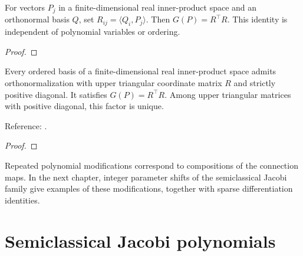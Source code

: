 \begin{supporting}
\begin{theorem}
\label{thm:mathlib-gram-factor}
\mathlibok
For vectors $P_j$ in a finite-dimensional real inner-product space and an
orthonormal basis $Q$, set $R_{ij}=\langle Q_i,P_j\rangle$. Then
$G(P)=R^\top R$. This identity is independent of polynomial variables or ordering.
\end{theorem}
\begin{proof}
\mathlibok
\end{proof}

\begin{theorem}
\label{thm:positive-gram-factor}
\leanok
Every ordered basis of a finite-dimensional real inner-product space admits
orthonormalization with upper triangular coordinate matrix $R$ and strictly
positive diagonal. It satisfies $G(P)=R^\top R$. Among upper triangular matrices
with positive diagonal, this factor is unique.

Reference: \cite[Section 4.2]{golub-van-loan}.
\end{theorem}
\begin{proof}
\leanok
\end{proof}

\end{supporting}

Repeated polynomial modifications correspond to compositions of the
connection maps. In the next chapter, integer parameter shifts of the
semiclassical Jacobi family give examples of these modifications, together
with sparse differentiation identities.

\chapter{Semiclassical Jacobi polynomials}\label{chap:semiclassical}

